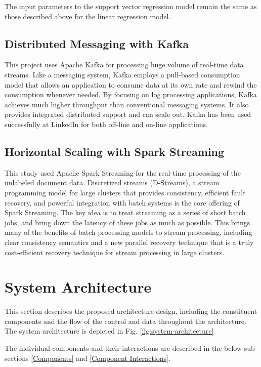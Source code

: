\documentclass[conference]{IEEEtran}
\begin{document}
        The input parameters to the support vector regression model remain the same as those described above for the linear regression model.


    \subsection{Distributed Messaging with Kafka}
        This project uses Apache Kafka for processing huge volume of real-time data streams. Like a messaging system, Kafka employs a pull-based consumption model that allows an application to consume data at its own rate and rewind the consumption whenever needed. By focusing on log processing applications, Kafka achieves much higher throughput than conventional messaging systems. It also provides integrated distributed support and can scale out. Kafka has been used successfully at LinkedIn for both off-line and on-line applications. \cite{kreps2011kafka}

    \subsection{Horizontal Scaling with Spark Streaming}
        This study used Apache Spark Streaming for the real-time processing of the unlabeled document data. Discretized streams (D-Streams), a stream programming model for large clusters that provides consistency, efficient fault recovery, and powerful integration with batch systems is the core offering of Spark Streaming. The key idea is to treat streaming as a series of short batch jobs, and bring down the latency of these jobs as much as possible. This brings many of the benefits of batch processing models to stream processing, including clear consistency semantics and a new parallel recovery technique that is a truly cost-efficient recovery technique for stream processing in large clusters\cite{zaharia2012discretized}.

\vspace{5mm}

\section{System Architecture}
    This section describes the proposed architecture design, including the constituent components and the flow of the control and data throughout the architecture.
    The system architecture is depicted in Fig. \ref{fig:system-architecture}

    The individual components and their interactions are described in the below sub-sections \ref{Components} and \ref{Component Interactions}.
\end{document}
